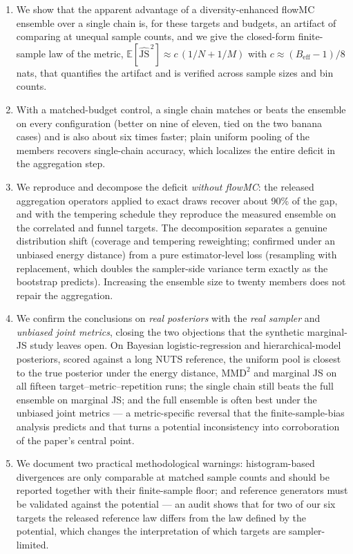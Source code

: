 \documentclass[11pt]{article}
\begin{document}
\begin{enumerate}
\item We show that the apparent advantage of a diversity-enhanced flowMC
ensemble over a single chain is, for these targets and budgets, an artifact of
comparing at unequal sample counts, and we give the closed-form finite-sample
law of the metric, $\mathbb{E}[\widehat{\mathrm{JS}}^{\,2}]\approx
c\,(1/N+1/M)$ with $c\approx(B_{\mathrm{eff}}-1)/8$ nats, that quantifies the
artifact and is verified across sample sizes and bin counts.
\item With a matched-budget control, a single chain matches or beats the
ensemble on every configuration (better on nine of eleven, tied on the two
banana cases) and is also about six times faster; plain uniform pooling of the
members recovers single-chain accuracy, which localizes the entire deficit in
the aggregation step.
\item We reproduce and decompose the deficit \emph{without flowMC}: the
released aggregation operators applied to exact draws recover about 90\% of
the gap, and with the tempering schedule they reproduce the measured ensemble
on the correlated and funnel targets. The decomposition separates a genuine
distribution shift (coverage and tempering reweighting; confirmed under an
unbiased energy distance) from a pure estimator-level loss (resampling with
replacement, which doubles the sampler-side variance term exactly as the
bootstrap predicts). Increasing the ensemble size to twenty members does not
repair the aggregation.
\item We confirm the conclusions on \emph{real posteriors} with the \emph{real
sampler} and \emph{unbiased joint metrics}, closing the two objections that the
synthetic marginal-JS study leaves open. On Bayesian logistic-regression and
hierarchical-model posteriors, scored against a long NUTS reference, the uniform
pool is closest to the true posterior under the energy distance, $\mathrm{MMD}^2$
and marginal JS on all fifteen target--metric--repetition runs; the single chain
still beats the full ensemble on marginal JS; and the full ensemble is often
best under the unbiased joint metrics --- a metric-specific reversal that the
finite-sample-bias analysis predicts and that turns a potential inconsistency
into corroboration of the paper's central point.
\item We document two practical methodological warnings: histogram-based
divergences are only comparable at matched sample counts and should be
reported together with their finite-sample floor; and reference generators
must be validated against the potential --- an audit shows that for two of our
six targets the released reference law differs from the law defined by the
potential, which changes the interpretation of which targets are
sampler-limited.
\end{enumerate}
\end{document}
